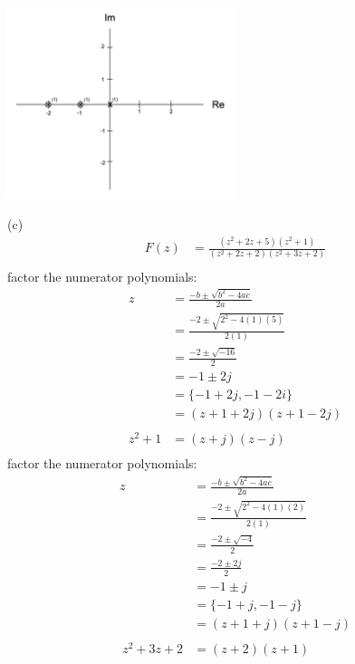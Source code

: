 \documentclass{article}
\begin{document}
\begin{center}
    \includegraphics[width=0.5\textwidth]{a6b.png}
\end{center}


(c)
\begin{equation*}
\begin{split}
    F(z) &= \frac{(z^2+2z+5)(z^2+1)}{(z^2+2z+2)(z^2+3z+2)}\\
\end{split}
\end{equation*}
factor the numerator polynomials:
\begin{equation*}
\begin{split}
    z &= \frac{-b \pm \sqrt{b^2 - 4ac}}{2a}\\
    &= \frac{-2 \pm \sqrt{2^2 - 4(1)(5)}}{2(1)}\\
    &= \frac{-2 \pm \sqrt{-16}}{2}\\
    &= -1 \pm 2j\\
    &= \{-1 + 2j, -1-2i\}\\
    &= (z + 1 + 2j)(z + 1 - 2j)\\\\
    z^2+1 &= (z+j)(z-j)\\
\end{split}
\end{equation*}
factor the numerator polynomials:
\begin{equation*}
\begin{split}
    z &= \frac{-b \pm \sqrt{b^2 - 4ac}}{2a}\\
    &= \frac{-2 \pm \sqrt{2^2 - 4(1)(2)}}{2(1)}\\
    &= \frac{-2 \pm \sqrt{-4}}{2}\\
    &= \frac{-2 \pm 2j}{2}\\
    &= -1 \pm j\\
    &= \{-1 + j, -1-j\}\\
    &= (z + 1 + j)(z + 1 - j)\\\\\
    z^2 + 3z + 2 &= (z + 2)(z + 1)
\end{split}
\end{equation*}
\end{document}
